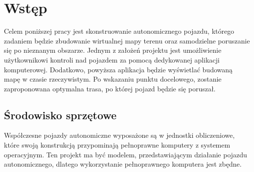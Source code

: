 \section{Wstęp}
    Celem poniższej pracy jest skonstruowanie autonomicznego pojazdu, którego zadaniem będzie zbudowanie wirtualnej mapy terenu oraz samodzielne poruszanie się po nieznanym obszarze.
    Jednym z założeń projektu jest umożliwienie użytkownikowi kontroli nad pojazdem za pomocą dedykowanej aplikacji komputerowej.
    Dodatkowo, powyższa aplikacja będzie wyświetlać budowaną mapę w czasie rzeczywistym.
    Po wskazaniu punktu docelowego, zostanie zaproponowana optymalna trasa, po której pojazd będzie się poruszał.


    \subsection{Środowisko sprzętowe}
    \label{subsec:hardware}
        Współczesne pojazdy autonomiczne wyposażone są w jednostki obliczeniowe, które swoją konstrukcją przypominają pełnoprawne komputery z systemem operacyjnym.
        Ten projekt ma być modelem,  przedstawiającym działanie pojazdu autonomicznego, dlatego wykorzystanie pełnoprawnego komputera jest zbędne.

